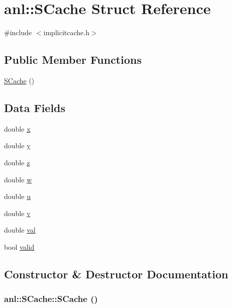\hypertarget{structanl_1_1SCache}{
\section{anl::SCache Struct Reference}
\label{structanl_1_1SCache}
}


{\ttfamily \#include $<$implicitcache.h$>$}\subsection*{Public Member Functions}
\begin{DoxyCompactItemize}
\item 
\hyperlink{structanl_1_1SCache_aaf3c95072d08bd50d673ffff2c56d041}{SCache} ()
\end{DoxyCompactItemize}
\subsection*{Data Fields}
\begin{DoxyCompactItemize}
\item 
double \hyperlink{structanl_1_1SCache_aad2ff3143b7cd3eedae4d79c274f6860}{x}
\item 
double \hyperlink{structanl_1_1SCache_a1ad36832ec734bbe5aa9c88d8b26a54c}{y}
\item 
double \hyperlink{structanl_1_1SCache_ac1b1997d6c218701d9922aa9b9d8d995}{z}
\item 
double \hyperlink{structanl_1_1SCache_afd600231dafcf6fc4b2488dde5992293}{w}
\item 
double \hyperlink{structanl_1_1SCache_aeb363ab3e0542c47cfeb04a3a24432e2}{u}
\item 
double \hyperlink{structanl_1_1SCache_a90e19abf5e21cf0cc3d5ae2a29270da7}{v}
\item 
double \hyperlink{structanl_1_1SCache_a7073890e7038e42f29a13c3a856f978e}{val}
\item 
bool \hyperlink{structanl_1_1SCache_a208e430ab9fd1a5cfc0fa939e2dc50ac}{valid}
\end{DoxyCompactItemize}


\subsection{Constructor \& Destructor Documentation}
\hypertarget{structanl_1_1SCache_aaf3c95072d08bd50d673ffff2c56d041}{
\subsubsection[{SCache}]{\setlength{\rightskip}{0pt plus 5cm}anl::SCache::SCache ()}}
\label{structanl_1_1SCache_aaf3c95072d08bd50d673ffff2c56d041}


